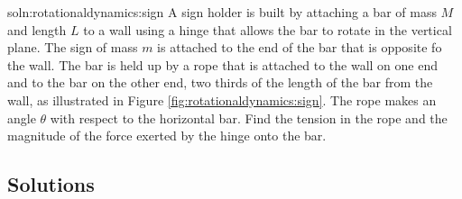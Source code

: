 \begin{problem}{soln:rotationaldynamics:sign}{\label{prob:rotationaldynamics:sign}
 A sign holder is built by attaching a bar of mass $M$ and length $L$ to a wall using a hinge that allows the bar to rotate in the vertical plane. The sign of mass $m$ is attached to the end of the  bar that is opposite fo the wall. The bar is held up by a rope that is attached to the wall on one end and to the bar on the other end, two thirds of the length of the bar from the wall, as illustrated in Figure \ref{fig:rotationaldynamics:sign}. The rope makes an angle $\theta$ with respect to the horizontal bar. Find the tension in the rope and the magnitude of the force exerted by the hinge onto the bar.}
\end{problem}


\newpage
\subsection{Solutions}

